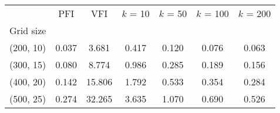 \begin{tabular}{ccccccc}
\toprule
{} &    PFI &     VFI &  $k$ = 10 &  $k$ = 50 &  $k$ = 100 &  $k$ = 200 \\
Grid size &        &         &           &           &            &            \\
\midrule
(200, 10) &  0.037 &   3.681 &     0.417 &     0.120 &      0.076 &      0.063 \\
(300, 15) &  0.080 &   8.774 &     0.986 &     0.285 &      0.189 &      0.156 \\
(400, 20) &  0.142 &  15.806 &     1.792 &     0.533 &      0.354 &      0.284 \\
(500, 25) &  0.274 &  32.265 &     3.635 &     1.070 &      0.690 &      0.526 \\
\bottomrule
\end{tabular}
